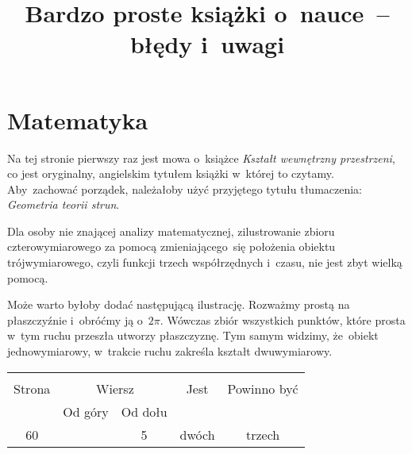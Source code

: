 \documentclass[a4paper,11pt]{article}
\title{Bardzo proste książki o~nauce~-- błędy i~uwagi}
\begin{document}





\maketitle %





\section{Matematyka}






\start {} Na tej stronie pierwszy raz jest mowa o~książce
\emph{Kształt wewnętrzny przestrzeni}, co jest oryginalny, angielskim
tytułem książki w~której to czytamy. Aby~zachować porządek, należałoby
użyć przyjętego tytułu tłumaczenia: \emph{Geometria teorii strun}.

\start {} Dla osoby nie znającej analizy matematycznej,
zilustrowanie zbioru czterowymiarowego za pomocą zmieniającego~się
położenia obiektu trójwymiarowego, czyli funkcji trzech współrzędnych
i~czasu, nie jest zbyt wielką pomocą.

Może warto byłoby dodać następującą ilustrację. Rozważmy prostą na
płaszczyźnie i~obróćmy ją o~$2 \pi$. Wówczas zbiór wszystkich punktów,
które prosta w~tym ruchu przeszła utworzy płaszczyznę. Tym samym
widzimy, że~obiekt jednowymiarowy, w~trakcie ruchu zakreśla kształt
dwuwymiarowy.


\begin{center}
  \begin{tabular}{|c|c|c|c|c|}
    \hline
    & \multicolumn{2}{c|}{} & & \\
    Strona & \multicolumn{2}{c|}{Wiersz} & Jest
                              & Powinno być \\ \cline{2-3}
    & Od góry & Od dołu & & \\
    \hline
    60 & & 5 & dwóch & trzech \\
    \hline
  \end{tabular}
\end{center}
\end{document}
